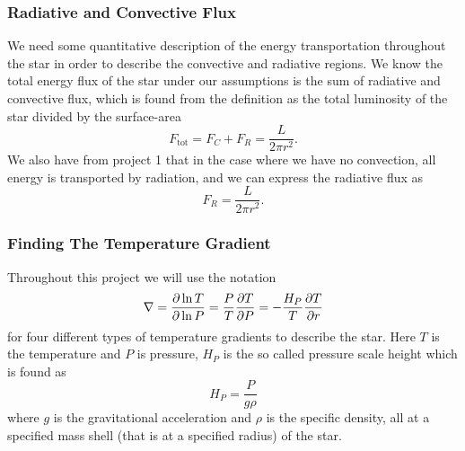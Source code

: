 \documentclass[11pt,a4paper,twocolumn,titlepage]{article}
\begin{document}
\subsubsection{Radiative and Convective Flux}\label{subsubsec:Governing/Rad_conv_flux}
We need some quantitative description of the energy transportation throughout the star in order to describe the convective and radiative regions. We know the total energy flux of the star under our assumptions is the sum of radiative and convective flux, which is found from the definition as the total luminosity of the star divided by the surface-area
\begin{equation}
F_\text{tot} = F_C + F_R = \frac{L}{2\pi r^2}.
\label{eq:Total_flux_of_L}
\end{equation}
We also have from project 1 that in the case where we have no convection, all energy is transported by radiation, and we can express the radiative flux as
\begin{equation}
F_R = \frac{L}{2\pi r^2}.    \label{eq:Only_radiative_flux_of_L}
\end{equation}

\subsubsection{Finding The Temperature Gradient}\label{subsubsec:Governing/Finding_Temperature_gradients}
Throughout this project we will use the notation
\begin{equation}
\nabla = \pdv{\ln T}{\ln P} = \frac{P}{T}\pdv{T}{P}= -\frac{H_P}{T}\pdv{T}{r} \label{eq:Def_nabla}
\end{equation}
for four different types of temperature gradients to describe the star. Here $T$ is the temperature and $P$ is pressure, $H_P$ is the so called pressure scale height which is found as 
\begin{equation}
H_P = \frac{P}{g\rho} \label{eq:Pressure_scale_height}
\end{equation}
where $g$ is the gravitational acceleration and $\rho$ is the specific density, all at a specified mass shell (that is at a specified radius) of the star.
\end{document}
